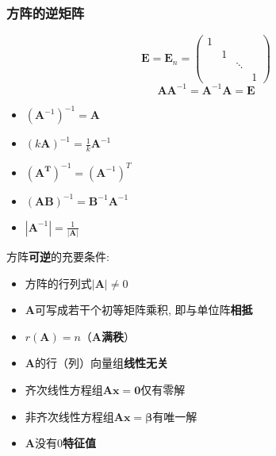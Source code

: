 \documentclass{article}
\begin{document}
			\subsubsection{方阵的逆矩阵}
				$$
				\boldsymbol{E}=\boldsymbol{E}_{n}=\left(\begin{array}{cccc}
					1 & & & \\
					& 1 & & \\
					& & \ddots & \\
					& & & 1
				\end{array}\right)
				$$
				$$
				\boldsymbol{A}\boldsymbol{A}^{-1}=\boldsymbol{A}^{-1}\boldsymbol{A}=\boldsymbol{E}
				$$
				\begin{itemize}
					\item $\left(\boldsymbol{A}^{-1}\right)^{-1}=\boldsymbol{A}$
					\item $\left(k\boldsymbol{A}\right)^{-1}=\frac{1}{k}\boldsymbol{A}^{-1}$
					\item $\left(\boldsymbol{A^T}\right)^{-1}=(\boldsymbol{A}^{-1})^T$
					\item $\left(\boldsymbol{AB}\right)^{-1}=\boldsymbol{B}^{-1}\boldsymbol A^{-1}$
					\item $\left|\boldsymbol{A}^{-1}\right|=\frac{1}{\left|\boldsymbol{A}\right|}$
				\end{itemize}
				方阵\textbf{可逆}的充要条件:
				\begin{itemize}
					\item 方阵的行列式$\left|\boldsymbol{A}\right| \neq 0$
					\item $\boldsymbol{A}$可写成若干个初等矩阵乘积, 即与单位阵\textbf{相抵}
					\item $r(\boldsymbol{A})=n$（$\boldsymbol{A}$\textbf{满秩}）
					\item $\boldsymbol{A}$的行（列）向量组\textbf{线性无关}
					\item 齐次线性方程组$\boldsymbol{A}\boldsymbol x=\mathbf0$仅有零解
					\item 非齐次线性方程组$\boldsymbol{Ax}=\boldsymbol \beta$有唯一解
					\item $\boldsymbol{A}$没有$0$\textbf{特征值}
				\end{itemize}
\end{document}

